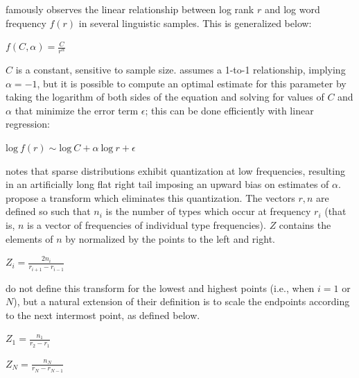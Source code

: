 \label{zr}

\citet{Zipf1949} famously observes the linear relationship between log rank $r$ and log word frequency $f(r)$ in several linguistic samples. This is generalized below:

\begin{unlabeledexample} 
$\displaystyle f(C, \alpha) = \frac{C}{r^\alpha}$ 
\end{unlabeledexample} 

\noindent 
$C$ is a constant, sensitive to sample size. \citeauthor{Zipf1949} assumes a 1-to-1 relationship, implying $\alpha = -1$, but it is possible to compute an optimal estimate for this parameter by taking the logarithm of both sides of the equation and solving for values of $C$ and $\alpha$ that minimize the error term $\epsilon$; this can be done efficiently with linear regression:

\begin{unlabeledexample} 
$\displaystyle \textrm{log}~f(r) \sim \textrm{log}~C + \alpha~\textrm{log}~r + \epsilon$  
\end{unlabeledexample}

\citet{Good1953} notes that sparse distributions exhibit quantization at low frequencies, resulting in an artificially long flat right tail imposing an upward bias on estimates of $\alpha$. \citet[][29]{Church1991} propose a transform which eliminates this quantization. The vectors $r, n$ are defined so such that $n_i$ is the number of types which occur at frequency $r_i$ (that is, $n$ is a vector of frequencies of individual type frequencies). $Z$ contains the elements of $n$ by normalized by the points to the left and right.

\begin{unlabeledexample}
$\displaystyle Z_i = \frac{2 n_i}{r_{i + 1} - r_{i - 1}}$
\end{unlabeledexample}

\noindent \citeauthor{Church1991} do not define this transform for the lowest and highest points (i.e., when $i = 1$ or $N$), but a natural extension of their definition is to scale the endpoints according to the next intermost point, as defined below.

\begin{unlabeledexample}
$\displaystyle Z_1 = \frac{n_1}{r_2 - r_1}$
\end{unlabeledexample}

\begin{unlabeledexample}
$\displaystyle Z_N = \frac{n_N}{r_N - r_{N - 1}}$
\end{unlabeledexample}

